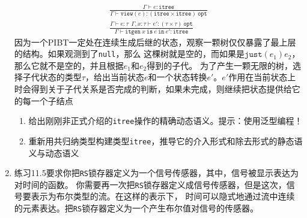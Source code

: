 \begin{enumerate}
	\begin{subequations}
		\begin{gather}
		\frac{\Gamma\vdash e:\texttt{itree}}
		{\Gamma\vdash\texttt{view}(e):(\texttt{itree}\times\texttt{itree})\ \texttt{opt}} \\
		\frac{\Gamma\vdash e:\tau\ \ \Gamma,x:\tau\vdash e':(\tau\times\tau)\ \texttt{opt}}
		{\Gamma\vdash\texttt{itgen}\ x\ \texttt{is}\ e\ \texttt{in}\ e':\texttt{itree}}
		\end{gather}
	\end{subequations}
	因为一个PIBT一定处在连续生成后继的状态，观察一颗树仅仅暴露了最上层的结构。如果观测到了\texttt{null}，那么
	这棵树就是空的，而如果是$\texttt{just}(e_1)e_2$，那么它就不是空的，并且根据$e_1$和$e_2$得到的子代。
	为了产生一颗无限的树，选择子代状态的类型$\tau$，给出当前状态$e$和一个状态转换$e'$。$e'$作用在当前状态上
	时会得到关于子代关系是否完成的判断，如果未完成，则继续把状态提供给它的每一个子结点
	\begin{enumerate}
		\renewcommand{\theenumi}{\alph{enumi}}
		\item 给出刚刚非正式介绍的\texttt{itree}操作的精确动态语义。提示：使用泛型编程！
		\item 重新用共归纳类型构建类型\texttt{itree}，推导它的介入形式和除去形式的静态语义与动态语义
	\end{enumerate}
	\item 练习11.5要求你把\texttt{RS}锁存器定义为一个信号传感器，其中，信号被显示表达为对时间的函数。
	你需要再一次把\texttt{RS}锁存器定义成信号传感器，但是这次，信号要表示为布尔类型的流。在这样的表示下，
	时间可以隐式地通过流中连续的元素表达。把\texttt{RS}锁存器定义为一个产生布尔值对信号的传感器。
\end{enumerate}

